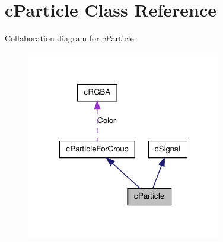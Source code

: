 \hypertarget{classc_particle}{
\section{cParticle Class Reference}
\label{classc_particle}
}


Collaboration diagram for cParticle:\nopagebreak
\begin{figure}[H]
\begin{center}
\leavevmode
\includegraphics[width=240pt]{classc_particle__coll__graph}
\end{center}
\end{figure}
